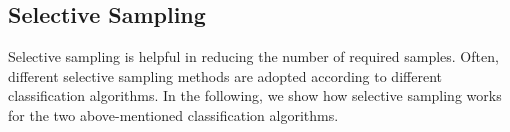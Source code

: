 



\subsection{Selective Sampling} \label{subsec:active:learning}
Selective sampling is helpful in reducing the number of required samples. 
Often, different selective sampling methods are adopted according to different classification algorithms. 
In the following, we show how selective sampling works for the two above-mentioned classification algorithms. %

